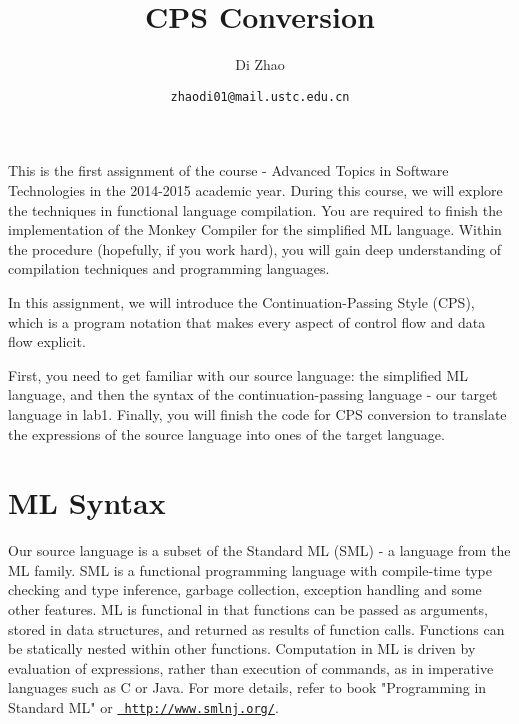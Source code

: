 \documentclass{article}
\theoremstyle{definition}
\theoremstyle{remark}
\numberwithin{equation}{section}
\begin{document}
\newcommand{\env}[1]{[\![#1]\!]\kappa}
\newcommand{\round}[1]{(\!|#1|\!)}

\title{CPS Conversion}%
\author{Di Zhao}%
\date{\small{\texttt{zhaodi01@mail.ustc.edu.cn}}}%

\maketitle

This is the first assignment of the course - Advanced Topics in
Software Technologies in the 2014-2015 academic year. During this
course, we will explore the techniques in functional language
compilation. You are required to finish
the implementation of the Monkey Compiler for the simplified ML
language. Within the procedure (hopefully, if you work hard),
 you will gain deep understanding of compilation techniques
 and programming languages.

In this assignment, we will introduce the Continuation-Passing
Style (CPS), which is a program notation that makes every aspect
of control flow and data flow explicit.

First, you need to get familiar with our source language: the
simplified ML language, and then the syntax of the
continuation-passing language - our target language in lab1.
Finally, you will finish the code for CPS conversion to
translate the expressions of the source language into ones
 of the target language.

\section{ML Syntax}

Our source language is a subset of the Standard ML (SML) - a language
from the ML family. SML is a functional programming language with
 compile-time type checking and type inference, garbage collection,
 exception handling and some other features. ML is functional in that
 functions can be passed as arguments, stored in data structures, and
returned as results of function calls. Functions can be statically
nested within other functions. Computation in ML is driven by
evaluation of expressions, rather than execution of commands, as in
imperative languages such as C or Java. For more details, refer to
book "Programming in Standard ML" or \href{http://www.smlnj.org/}
{\texttt{ http://www.smlnj.org/}}.
\end{document}
